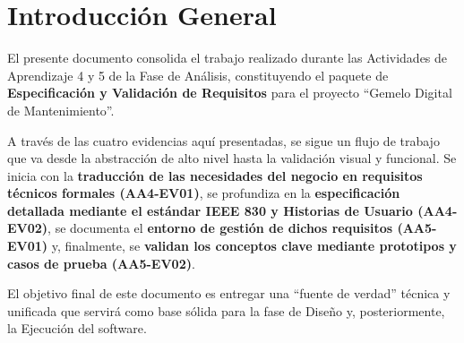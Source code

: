 \chapter*{Introducción General}
{}

El presente documento consolida el trabajo realizado durante las Actividades de Aprendizaje 4 y 5 de la Fase de Análisis, constituyendo el paquete de \textbf{Especificación y Validación de Requisitos} para el proyecto ``Gemelo Digital de Mantenimiento''.

A través de las cuatro evidencias aquí presentadas, se sigue un flujo de trabajo que va desde la abstracción de alto nivel hasta la validación visual y funcional. Se inicia con la \textbf{traducción de las necesidades del negocio en requisitos técnicos formales (AA4-EV01)}, se profundiza en la \textbf{especificación detallada mediante el estándar IEEE 830 y Historias de Usuario (AA4-EV02)}, se documenta el \textbf{entorno de gestión de dichos requisitos (AA5-EV01)} y, finalmente, se \textbf{validan los conceptos clave mediante prototipos y casos de prueba (AA5-EV02)}.

El objetivo final de este documento es entregar una ``fuente de verdad'' técnica y unificada que servirá como base sólida para la fase de Diseño y, posteriormente, la Ejecución del software.
